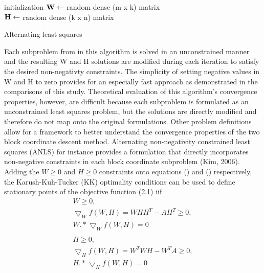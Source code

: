 \documentclass[final,leqno,onefignum,onetabnum]{siamltex1213}
\begin{document}
\begin{algorithm}[H]	

 initialization\;
$\bf{W} \gets $ random dense (m x k) matrix\\
$\bf{H} \gets $ random dense (k x n) matrix\\
 \caption{Alternating least squares}
\end{algorithm} 

Each subproblem from in this algorithm is solved in an unconstrained manner and the resulting W and H solutions are modified during each iteration to satisfy the desired non-negativty constraints. The simplicity of setting negative values in W and H to zero provides for an especially fast approach as demonstrated in the comparisons of this study. Theoretical evaluation of this algorithm's convergence properties, however, are difficult because each subproblem is formulated as an unconstrained least squares problem, but the solutions are directly modified and therefore do not map onto the original formulations. Other problem definitions allow for a framework to better understand the convergence properties of the two block coordinate descent method. Alternating non-negativity constrained least squares (ANLS) for instance provides a formulation that directly incorporates non-negative constraints in each block coordinate subproblem (Kim, 2006). Adding the $W \ge 0$ and  $ H \ge 0 $ constraints onto equations () and () respectively, the Karush-Kuh-Tucker (KK) optimality conditions can be used to define stationary points of the objective function (2.1) iif
\begin{equation}\label{EKx}
\begin{align} 
  W \ge 0,\\
  \bigtriangledown_W f(W,H)  = WHH^T - AH^T \ge 0,\\
  W.* \bigtriangledown_Wf(W,H) = 0\\ \\
    H \ge 0,\\ 
  \bigtriangledown_H f(W,H)  = W^T WH - W^T A \ge 0,\\
  H.* \bigtriangledown_Hf(W,H) = 0  
  \end{align}
\end{equation}
\end{document}
